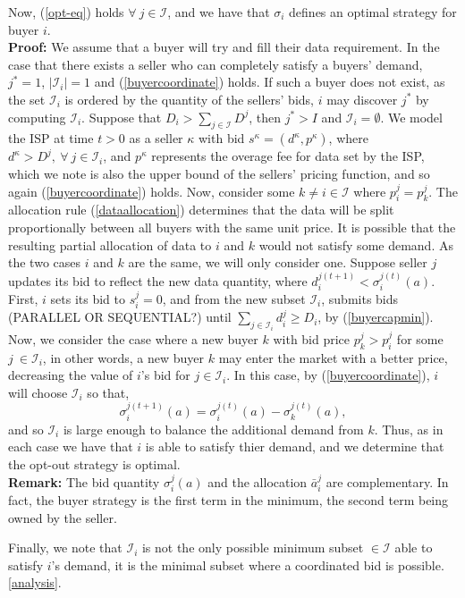 \documentclass[12pt]{article}
\theoremstyle{definition}
\newcommand{\mcI}{\mathcal{I}}
\newcommand{\g}{\sigma}
\begin{document}
\begin{multicols}{2}
{\begin{equation}
\end{equation}
Now, (\ref{opt-eq}) holds $\forall \ j\in\mcI$,
and we have that $\g_i$ defines an optimal strategy for buyer $i$.
}\\
\textbf{Proof:}
We assume that a buyer will try and fill their data requirement.
In the case that there exists a seller who can completely satisfy a buyers'
demand, $j^*=1$, $\vert \mcI_i\vert =1$ and (\ref{buyercoordinate}) holds. If such a buyer does not exist,
as the set $\mcI_i$ is ordered by the quantity of the sellers' bids, $i$ may discover 
$j^*$ by computing $\mcI_i$.
Suppose that $D_i >
\sum_{j\in\mcI}D^j$, then $j^* > I$ and $\mcI_i = \emptyset$. 
We model the ISP at time $t>0$ as a seller $\kappa$ with bid $s^\kappa =(d^\kappa, p^\kappa)$,
where $d^\kappa > D^j, \
\forall \ j\in\mcI_i$, and
$p^\kappa$ represents the overage fee for data set by the ISP, which we note is also the upper bound of the sellers'
pricing function, and so again (\ref{buyercoordinate}) holds.
Now, consider some $k \ne i \in \mcI$ where $p_i^j = p_k^j$. 
The allocation rule (\ref{dataallocation}) determines that the data will be
split proportionally
between all buyers with the same unit price. 
It is possible that the resulting partial allocation of data to $i$ and $k$
would not satisfy some demand. As the two cases $i$ and $k$ are the same, we
will only consider one. Suppose seller $j$ updates its
bid to reflect the new data quantity, where
$d_i^{j(t+1)} < \g_i^{j(t)}(a)$. First, $i$ sets its bid to $s_i^j = 0$, and
from the new subset $\mcI_i$, submits bids (PARALLEL OR SEQUENTIAL?) until
$\sum_{j\in\mcI_i} d_i^j \ge D_i$, by (\ref{buyercapmin}).
Now, we consider the case where a new buyer $k$ with bid
price $p_k^j > p_i^j$ for some $j \ \in \mcI_i$, in other
words, a new buyer $k$ may enter the market with a better price, decreasing the
value of $i$'s bid for $j\in\mcI_i$. In this case, by (\ref{buyercoordinate}),
$i$ will choose $\mcI_i$ so that,
$$
    \g_i^{j(t+1)}(a) = \g_i^{j(t)}(a) - \g_k^{j(t)}(a),
$$
and so $\mcI_i$ is large enough to balance the additional demand from
$k$. Thus, as in each case we have that $i$ is able to satisfy thier demand,
and we determine that the opt-out strategy is optimal.\\
\textbf{Remark:} The bid quantity $\g_i^j(a)$ and the allocation $\bar{a}_i^j$
are complementary. In fact, the buyer strategy is the first term in the
minimum, the second term being owned by the seller.

Finally, we note that $\mcI_i$ is not the only
possible minimum subset $\in\mcI$ able to satisfy $i$'s demand, it is the
minimal subset where a coordinated bid is possible.
\ref{analysis}. 


\end{multicols}
\end{document}
